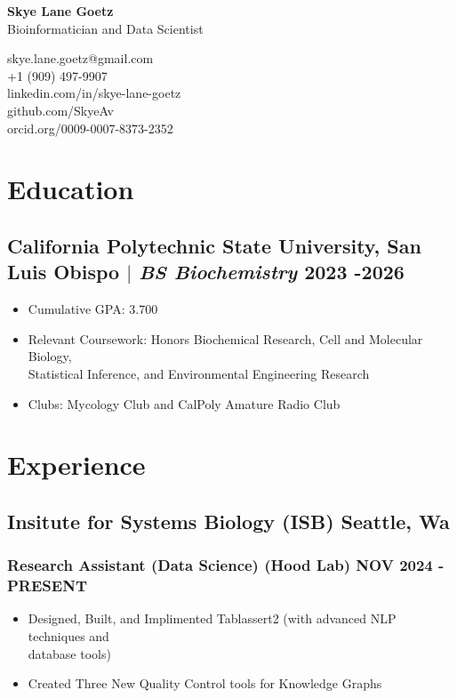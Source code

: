 \documentclass[11pt]{article} %
\begin{document}
\begin{center}
	\begin{minipage}{0.5\textwidth}
		{\Huge\bfseries
			Skye Lane Goetz %
		} \\ \medskip
		Bioinformatician and Data Scientist %
	\end{minipage} \hfill
	\begin{minipage}{0.4\textwidth}
		\raggedleft
		skye.lane.goetz@gmail.com \\
		+1 (909) 497-9907 \\
		linkedin.com/in/skye-lane-goetz \\
		github.com/SkyeAv \\
		orcid.org/0009-0007-8373-2352
	\end{minipage}
\end{center}

\section{Education}
\subsection{\small California Polytechnic State University, San Luis Obispo $|$ {\normalfont\itshape BS Biochemistry} \hfill 2023 -2026}
\begin{itemize}
	\item Cumulative GPA: 3.700
  	\item Relevant Coursework: Honors Biochemical Research, Cell and Molecular Biology, \\ Statistical Inference, and Environmental Engineering Research
  	\item Clubs: Mycology Club and CalPoly Amature Radio Club
\end{itemize}

\section{Experience}
\subsection{Insitute for Systems Biology (ISB) \hfill Seattle, Wa}
\subsubsection{Research Assistant (Data Science) (Hood Lab) \hfill  NOV 2024 - PRESENT}
\begin{itemize}
	\item Designed, Built, and Implimented Tablassert2 (with advanced NLP techniques and \\ database tools)
	\item Created Three New Quality Control tools for Knowledge Graphs
\end{itemize}
\end{document}
